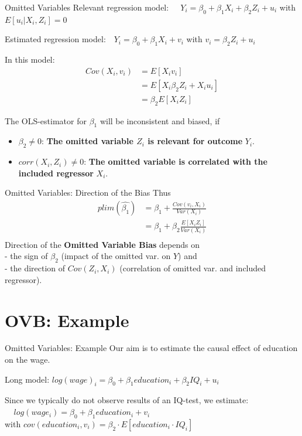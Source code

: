 \documentclass[11pt, aspectratio = 169]{beamer}
\begin{document}
\begin{frame}{Omitted Variables}
Relevant regression model: 
$\: \: \: \: \: Y_i = \beta_0 + \beta_1 X_{i} + \beta_2 Z_i + u_i$   with $E[u_i | X_{i}, Z_i] = 0$
\vspace{+0.2cm}

Estimated regression model:
$\: \: \: Y_i = \beta_0 + \beta_1 X_{i} +v_i$   with $v_i =  \beta_2 Z_i + u_i$ 
\pause

In this model: \begin{align*}
    Cov(X_i, v_i) & = E[X_i v_i] \\
    & = E[X_i\beta_2Z_i + X_i u_i] \\
    & = \beta_2E[X_i Z_i]
\end{align*}

\pause

The OLS-estimator for $\beta_1$ will be inconsistent and biased, if
\begin{itemize}
    \item $\beta_2 \neq 0$: \textbf{The omitted variable $Z_i$ is relevant for outcome} $Y_i$.
    \item $corr(X_i, Z_i) \neq 0$: \textbf{The omitted variable is correlated with the included regressor} $X_i$.
\end{itemize}
\end{frame}

\begin{frame}{Omitted Variables: Direction of the Bias}
Thus
\begin{align*}
plim(\hat{\beta_1})& = \beta_1 + \frac{ Cov(v_i, X_{i})}{Var(X_{i})} \\
& = \beta_1  + \beta_2 \frac{ E[X_iZ_i] }{Var(X_{i})} \\
\end{align*}
\alert{Direction of the \textbf{Omitted Variable Bias}} depends on \\
- the sign of $\beta_2$ (impact of the omitted var. on $Y$) and  \\
- the direction of $Cov(Z_i, X_i)$ (correlation of omitted var. and included regressor).
\end{frame}

\section{OVB: Example}
\begin{frame}[fragile]{Omitted Variables: Example}
Our aim is to estimate the causal effect of education on the wage. 

Long model:
$log(wage)_i = \beta_0 + \beta_1 education_i + \beta_2 IQ_i + u_i$
\bigskip

Since we typically do not observe results of an IQ-test, we estimate: \\
$\: \: \: \: \: log(wage_i) = \beta_0 + \beta_1 education_i + v_i$ \\ \vspace{+0.1cm}
\hspace*{+0.2cm} with
$cov(education_i, v_i) = \beta_2 \cdot E[education_i\cdot IQ_i]$
\end{frame}
\end{document}
